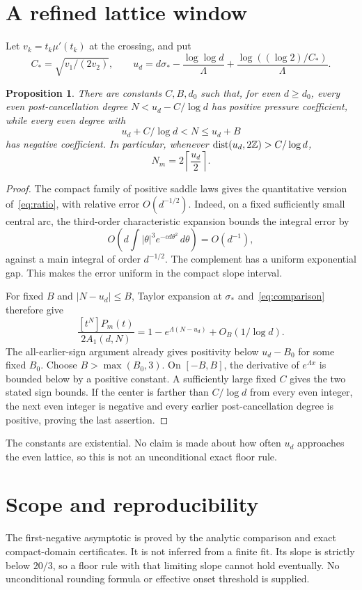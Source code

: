\documentclass[11pt,a4paper]{article}
\newtheorem{proposition}[theorem]{Proposition}
\theoremstyle{remark}\newtheorem*{ednote}{Editorial note (ProveIt, 2026-10-01)}
\begin{document}
\section{A refined lattice window}
Let $v_k=t_k\mu'(t_k)$ at the crossing, and put
\[
 C_*=\sqrt{v_1/(2v_2)},\qquad
 u_d=d\sigma_*-\frac{\log\log d}{\Lambda}
                +\frac{\log((\log2)/C_*)}{\Lambda}.
\]
\begin{proposition}\label{prop:rounding}
There are constants $C,B,d_0$ such that, for even $d\ge d_0$, every even post-cancellation degree $N<u_d-C/\log d$ has positive pressure coefficient, while every even degree with
\[
 u_d+C/\log d<N\le u_d+B
\]
has negative coefficient. In particular, whenever
$\operatorname{dist}(u_d,2\mathbb Z)>C/\log d$,
\[
 N_m=2\left\lceil\frac{u_d}{2}\right\rceil.
\]
\end{proposition}
\begin{proof}
The compact family of positive saddle laws gives the quantitative version of~\eqref{eq:ratio}, with relative error $O(d^{-1/2})$. Indeed, on a fixed sufficiently small central arc, the third-order characteristic expansion bounds the integral error by
\[
 O\left(d\int |\theta|^3e^{-cd\theta^2}\,d\theta\right)=O(d^{-1}),
\]
against a main integral of order $d^{-1/2}$. The complement has a uniform exponential gap. This makes the error uniform in the compact slope interval.

For fixed $B$ and $|N-u_d|\le B$, Taylor expansion at $\sigma_*$ and~\eqref{eq:comparison} therefore give
\[
 \frac{[t^N]P_m(t)}{2A_1(d,N)}
 =1-e^{\Lambda(N-u_d)}+O_B(1/\log d).
\]
The all-earlier-sign argument already gives positivity below $u_d-B_0$ for some fixed $B_0$. Choose $B>\max(B_0,3)$. On $[-B,B]$, the derivative of $e^{\Lambda x}$ is bounded below by a positive constant. A sufficiently large fixed $C$ gives the two stated sign bounds. If the center is farther than $C/\log d$ from every even integer, the next even integer is negative and every earlier post-cancellation degree is positive, proving the last assertion.
\end{proof}
The constants are existential. No claim is made about how often $u_d$ approaches the even lattice, so this is not an unconditional exact floor rule.

\section{Scope and reproducibility}
The first-negative asymptotic is proved by the analytic comparison and exact compact-domain certificates. It is not inferred from a finite fit. Its slope is strictly below $20/3$, so a floor rule with that limiting slope cannot hold eventually. No unconditional rounding formula or effective onset threshold is supplied.
\end{document}
